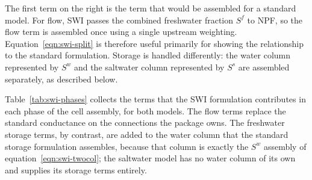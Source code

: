 \noindent The first term on the right is the term that would be assembled for a standard \mf model. For flow, SWI passes the combined freshwater fraction $S^{f}$ to NPF, so the flow term is assembled once using a single upstream weighting. Equation~\ref{eqn:swi-split} is therefore useful primarily for showing the relationship to the standard formulation. Storage is handled differently: the water column represented by $S^{w}$ and the saltwater column represented by $S^{s}$ are assembled separately, as described below.

Table~\ref{tab:swi-phases} collects the terms that the SWI formulation contributes in each phase of the \mf cell assembly, for both models. The flow terms replace the standard conductance on the connections the package owns. The freshwater storage terms, by contrast, are added to the water column that the standard storage formulation assembles, because that column is exactly the $S^{w}$ assembly of equation~\ref{eqn:swi-twocol}; the saltwater model has no water column of its own and supplies its storage terms entirely.

